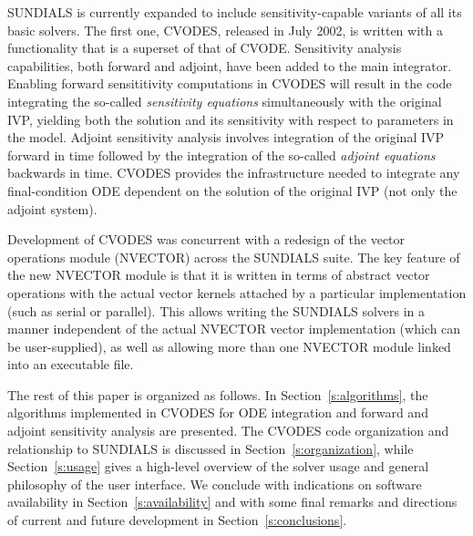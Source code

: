 SUNDIALS is currently expanded to include sensitivity-capable variants of all
its basic solvers. The first one, CVODES, released in July 2002, 
is written with a functionality that is a superset of that of CVODE. 
Sensitivity analysis capabilities, both forward and adjoint, have been added to 
the main integrator. Enabling forward sensititivity computations 
in CVODES will result in the code integrating the so-called 
{\em sensitivity equations} simultaneously with the original IVP, 
yielding both the solution and its sensitivity with respect to parameters in the model. 
Adjoint sensitivity analysis involves integration of the 
original IVP forward in time followed by the integration of the so-called 
{\em adjoint equations} backwards in time. 
CVODES provides the infrastructure needed to integrate any final-condition ODE
dependent on the solution of the original IVP (not only the adjoint system). 

Development of CVODES was concurrent with a redesign of the vector operations module 
(NVECTOR) across the SUNDIALS suite. The key feature of the new NVECTOR module is that it
is written in terms of abstract vector operations with the actual vector kernels attached
by a particular implementation (such as serial or parallel). This allows
writing the SUNDIALS solvers in a manner independent of the actual NVECTOR vector
implementation (which can be user-supplied), as well as allowing more than one 
NVECTOR module linked into an executable file. 

The rest of this paper is organized as follows. In Section~\ref{s:algorithms}, the
algorithms implemented in CVODES for ODE integration and forward and adjoint 
sensitivity analysis are presented. The CVODES code organization and relationship
to SUNDIALS is discussed in Section~\ref{s:organization}, while Section~\ref{s:usage}
gives a high-level overview of the solver usage and general
philosophy of the user interface. We conclude with indications on software availability
in Section~\ref{s:availability} and with some final remarks and directions
of current and future development in Section~\ref{s:conclusions}.

